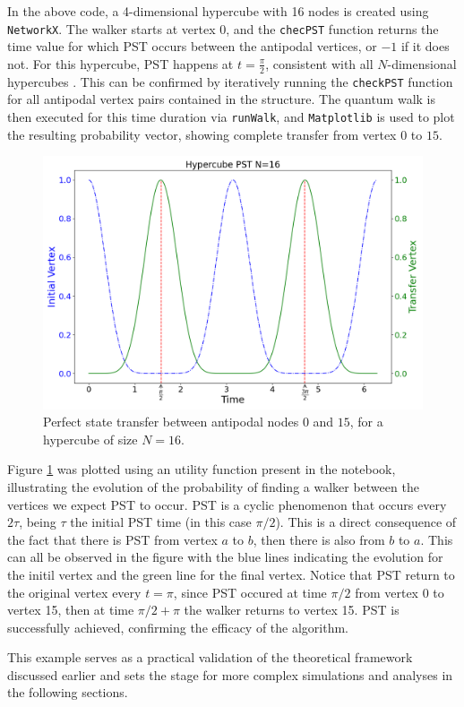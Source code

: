 \documentclass[main.tex]{subfiles}
\begin{document}
In the above code, a 4-dimensional hypercube with 16 nodes is created using
\texttt{NetworkX}. The walker starts at vertex 0, and the \texttt{checPST}
function returns the time value for which PST occurs between the antipodal
vertices, or $-1$ if it does not. For this hypercube, PST happens at $t =
\frac{\pi}{2}$, consistent with all $N$-dimensional hypercubes
\cite{christandlPerfect04,Christandl2005}. This can be confirmed by iteratively
running the \texttt{checkPST} function for all antipodal vertex pairs contained
in the structure. The quantum walk is then executed for this time duration via
\texttt{runWalk}, and \texttt{Matplotlib} is used to plot the resulting
probability vector, showing complete transfer from vertex $0$ to $15$.\par

\begin{figure}[!h]
    \centering
    \includegraphics[scale=\mysinglefigurescale]{img/QWAK/PerfectStateTransfer/Hypercube_N16_T6.28_FROM0_TO15.png}
    \caption{Perfect state transfer between antipodal nodes $0$ and $15$, for a hypercube of size $N=16$.}
    \label{fig:hypercube_pst}
\end{figure}

Figure \ref{fig:hypercube_pst} was plotted using an utility function present in
the notebook, illustrating the evolution of the probability of finding a walker
between the vertices we expect PST to occur. PST is a cyclic phenomenon that
occurs every $2\tau$, being $\tau$ the initial PST time (in this case $\pi/2$).
This is a direct consequence of the fact that there is PST from vertex $a$ to
$b$, then there is also from $b$ to $a$. This can all be observed in the figure
with the blue lines indicating the evolution for the initil vertex and the
green line for the final vertex. Notice that PST return to the original vertex
every $t=\pi$, since PST occured at time $\pi/2$ from vertex 0 to vertex 15,
then at time $\pi/2 + \pi$ the walker returns to vertex 15. PST is successfully
achieved, confirming the efficacy of the algorithm.

This example serves as a practical validation of the theoretical framework
discussed earlier and sets the stage for more complex simulations and analyses
in the following sections.
\end{document}
